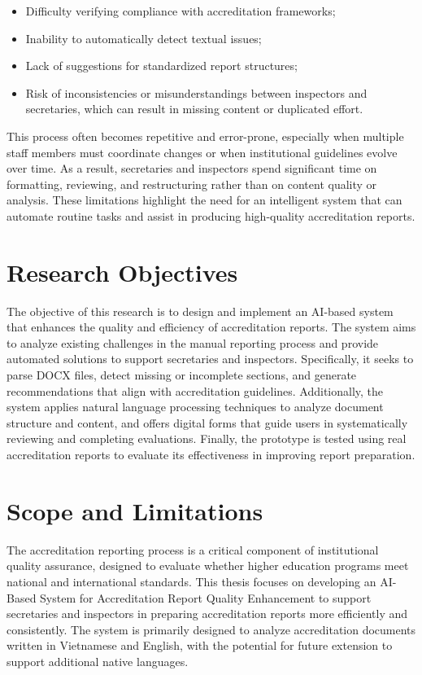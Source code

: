 \begin{itemize}
    \item Difficulty verifying compliance with accreditation frameworks;
    \item Inability to automatically detect textual issues;
    \item Lack of suggestions for standardized report structures;
    \item Risk of inconsistencies or misunderstandings between inspectors and secretaries, which can result in missing content or duplicated effort.
\end{itemize}

This process often becomes repetitive and error-prone, especially when multiple staff members must coordinate changes or when institutional guidelines evolve over time. As a result, secretaries and inspectors spend significant time on formatting, reviewing, and restructuring rather than on content quality or analysis. These limitations highlight the need for an intelligent system that can automate routine tasks and assist in producing high-quality accreditation reports.

\section{Research Objectives}
The objective of this research is to design and implement an AI-based system that enhances the quality and efficiency of accreditation reports. The system aims to analyze existing challenges in the manual reporting process and provide automated solutions to support secretaries and inspectors. Specifically, it seeks to parse DOCX files, detect missing or incomplete sections, and generate recommendations that align with accreditation guidelines. Additionally, the system applies natural language processing techniques to analyze document structure and content, and offers digital forms that guide users in systematically reviewing and completing evaluations. Finally, the prototype is tested using real accreditation reports to evaluate its effectiveness in improving report preparation.
    
\section{Scope and Limitations}
The accreditation reporting process is a critical component of institutional quality assurance, designed to evaluate whether higher education programs meet national and international standards. This thesis focuses on developing an AI-Based System for Accreditation Report Quality Enhancement to support secretaries and inspectors in preparing accreditation reports more efficiently and consistently. The system is primarily designed to analyze accreditation documents written in Vietnamese and English, with the potential for future extension to support additional native languages.

